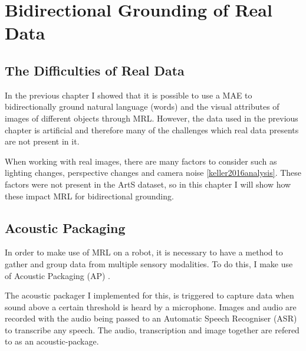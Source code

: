 
\chapter{Bidirectional Grounding of Real Data} %

\label{Chapter6} %


\section{The Difficulties of Real Data}
In the previous chapter I showed that it is possible to use a MAE to bidirectionally ground natural language (words) and the visual attributes of images of different objects through MRL. However, the data used in the previous chapter is artificial and therefore many of the challenges which real data presents are not present in it. 

When working with real images, there are many factors to consider such as lighting changes, perspective changes and camera noise \ref{keller2016analysis}. These factors were not present in the ArtS dataset, so in this chapter I will show how these impact MRL for bidirectional grounding.

\section{Acoustic Packaging}
In order to make use of MRL on a robot, it is necessary to have a method to gather and group data from multiple sensory modalities. To do this, I make use of Acoustic Packaging (AP) \cite{schillingmann2009towards, schillingmann2009computational}.

The acoustic packager I implemented for this, is triggered to capture data when sound above a certain threshold is heard by a microphone. Images and audio are recorded with the audio being passed to an Automatic Speech Recogniser (ASR) to transcribe any speech. The audio, transcription and image together are refered to as an acoustic-package.



